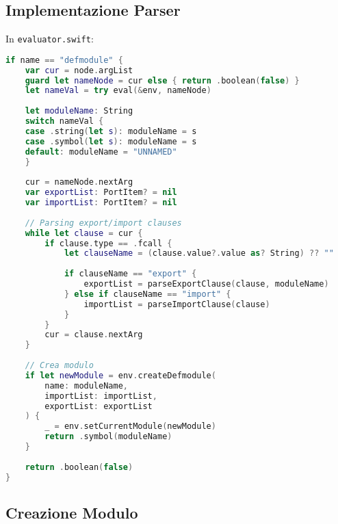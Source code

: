 \subsection{Implementazione Parser}

In \texttt{evaluator.swift}:

\begin{lstlisting}[language=Swift]
if name == "defmodule" {
    var cur = node.argList
    guard let nameNode = cur else { return .boolean(false) }
    let nameVal = try eval(&env, nameNode)
    
    let moduleName: String
    switch nameVal {
    case .string(let s): moduleName = s
    case .symbol(let s): moduleName = s
    default: moduleName = "UNNAMED"
    }
    
    cur = nameNode.nextArg
    var exportList: PortItem? = nil
    var importList: PortItem? = nil
    
    // Parsing export/import clauses
    while let clause = cur {
        if clause.type == .fcall {
            let clauseName = (clause.value?.value as? String) ?? ""
            
            if clauseName == "export" {
                exportList = parseExportClause(clause, moduleName)
            } else if clauseName == "import" {
                importList = parseImportClause(clause)
            }
        }
        cur = clause.nextArg
    }
    
    // Crea modulo
    if let newModule = env.createDefmodule(
        name: moduleName,
        importList: importList,
        exportList: exportList
    ) {
        _ = env.setCurrentModule(newModule)
        return .symbol(moduleName)
    }
    
    return .boolean(false)
}
\end{lstlisting}

\subsection{Creazione Modulo}

